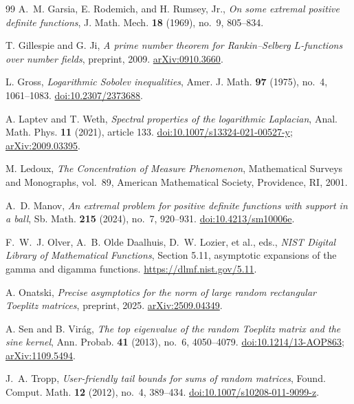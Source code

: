 \documentclass[11pt,reqno]{amsart}
\numberwithin{equation}{section}
\begin{document}
\begin{thebibliography}{99}
A.~M. Garsia, E. Rodemich, and H. Rumsey, Jr.,
\emph{On some extremal positive definite functions},
J. Math. Mech. \textbf{18} (1969), no.~9, 805--834.

T. Gillespie and G. Ji,
\emph{A prime number theorem for Rankin--Selberg $L$-functions
over number fields},
preprint, 2009.
\href{https://arxiv.org/abs/0910.3660}{arXiv:0910.3660}.

L. Gross,
\emph{Logarithmic Sobolev inequalities},
Amer. J. Math. \textbf{97} (1975), no.~4, 1061--1083.
\href{https://doi.org/10.2307/2373688}{doi:10.2307/2373688}.

A. Laptev and T. Weth,
\emph{Spectral properties of the logarithmic Laplacian},
Anal. Math. Phys. \textbf{11} (2021), article 133.
\href{https://doi.org/10.1007/s13324-021-00527-y}{doi:10.1007/s13324-021-00527-y};
\href{https://arxiv.org/abs/2009.03395}{arXiv:2009.03395}.

M. Ledoux,
\emph{The Concentration of Measure Phenomenon},
Mathematical Surveys and Monographs, vol.~89,
American Mathematical Society, Providence, RI, 2001.

A.~D. Manov,
\emph{An extremal problem for positive definite functions with support in a ball},
Sb. Math. \textbf{215} (2024), no.~7, 920--931.
\href{https://doi.org/10.4213/sm10006e}{doi:10.4213/sm10006e}.

F.~W.~J. Olver, A.~B. Olde Daalhuis, D.~W. Lozier, et al., eds.,
\emph{NIST Digital Library of Mathematical Functions},
Section 5.11, asymptotic expansions of the gamma and digamma functions.
\url{https://dlmf.nist.gov/5.11}.

A. Onatski,
\emph{Precise asymptotics for the norm of large random rectangular Toeplitz matrices},
preprint, 2025.
\href{https://arxiv.org/abs/2509.04349}{arXiv:2509.04349}.

A. Sen and B. Vir\'ag,
\emph{The top eigenvalue of the random Toeplitz matrix and the sine kernel},
Ann. Probab. \textbf{41} (2013), no.~6, 4050--4079.
\href{https://doi.org/10.1214/13-AOP863}{doi:10.1214/13-AOP863};
\href{https://arxiv.org/abs/1109.5494}{arXiv:1109.5494}.

J.~A. Tropp,
\emph{User-friendly tail bounds for sums of random matrices},
Found. Comput. Math. \textbf{12} (2012), no.~4, 389--434.
\href{https://doi.org/10.1007/s10208-011-9099-z}{doi:10.1007/s10208-011-9099-z}.

\end{thebibliography}
\end{document}
